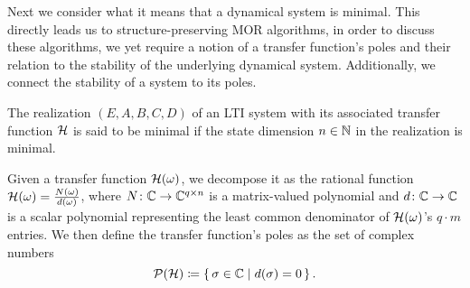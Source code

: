 
Next we consider what it means that a dynamical system is minimal.
This directly leads us to structure-preserving \ac{MOR} algorithms, in order to discuss these algorithms, we yet require a notion of a transfer function's poles and their relation to the stability of the underlying dynamical system.
Additionally, we connect the stability of a system to its poles.

\begin{definition}\label{def:minimal-system}
    The realization $(E, A, B, C, D)$ of an \ac{LTI} system with its associated transfer function $\mathcal{H}$ is said to be minimal if the state dimension $n \in \mathbb{N}$ in the realization is minimal.
\end{definition}

\begin{definition}\label{def:transfer-function-poles}
    Given a transfer function $\mathcal{H}(\omega)$, we decompose it as the rational function $\mathcal{H}(\omega) = \frac{N(\omega)}{d(\omega)}$, where $N \colon \mathbb{C} \to \mathbb{C}^{q \times n}$ is a matrix-valued polynomial and $d \colon \mathbb{C} \to \mathbb{C}$ is a scalar polynomial representing the least common denominator of $\mathcal{H}(\omega)$'s $q \cdot m$ entries.
    We then define the transfer function's poles as the set of complex numbers
    \begin{equation*}
        \mathcal{P}(\mathcal{H}) \coloneqq \left\{\,\sigma \in \mathbb{C}\mid d(\sigma) = 0\,\right\}.
    \end{equation*}
\end{definition}

